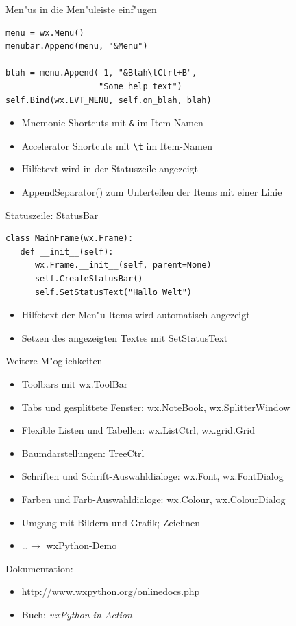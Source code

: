 \begin{frame}[fragile]{Men"us in die Men"uleiste einf"ugen}

\begin{lstlisting}[style=Python]
menu = wx.Menu()
menubar.Append(menu, "&Menu")

blah = menu.Append(-1, "&Blah\tCtrl+B",
                   "Some help text")
self.Bind(wx.EVT_MENU, self.on_blah, blah)
\end{lstlisting}
\begin{itemize}
\item \alert{Mnemonic Shortcuts} mit \lstinline{&} im Item-Namen
\item \alert{Accelerator Shortcuts} mit \lstinline{\t} im Item-Namen
\item \alert{Hilfetext} wird in der Statuszeile angezeigt
\item \alert{AppendSeparator()} zum Unterteilen der Items mit einer Linie
\end{itemize}
\end{frame}

\begin{frame}[fragile]{Statuszeile: StatusBar}

\begin{lstlisting}[style=Python]
class MainFrame(wx.Frame):
   def __init__(self):
      wx.Frame.__init__(self, parent=None)
      self.CreateStatusBar()
      self.SetStatusText("Hallo Welt")
\end{lstlisting}
\begin{itemize}
\item Hilfetext der Men"u-Items wird automatisch angezeigt
\item Setzen des angezeigten Textes mit \alert{SetStatusText}
\end{itemize}
\end{frame}


\begin{frame}{Weitere M"oglichkeiten}
\begin{itemize}
\item Toolbars mit wx.ToolBar
\item Tabs und gesplittete Fenster: wx.NoteBook, wx.SplitterWindow
\item Flexible Listen und Tabellen: wx.ListCtrl, wx.grid.Grid
\item Baumdarstellungen: TreeCtrl
\item Schriften und Schrift-Auswahldialoge: wx.Font, wx.FontDialog
\item Farben und Farb-Auswahldialoge: wx.Colour, wx.ColourDialog
\item Umgang mit Bildern und Grafik; Zeichnen
\item \dots $\rightarrow$ wxPython-Demo
\end{itemize}
Dokumentation:
\begin{itemize}
\item \href{http://www.wxpython.org/onlinedocs.php}{http://www.wxpython.org/onlinedocs.php}
\item Buch: \emph{wxPython in Action}
\end{itemize}
\end{frame}


